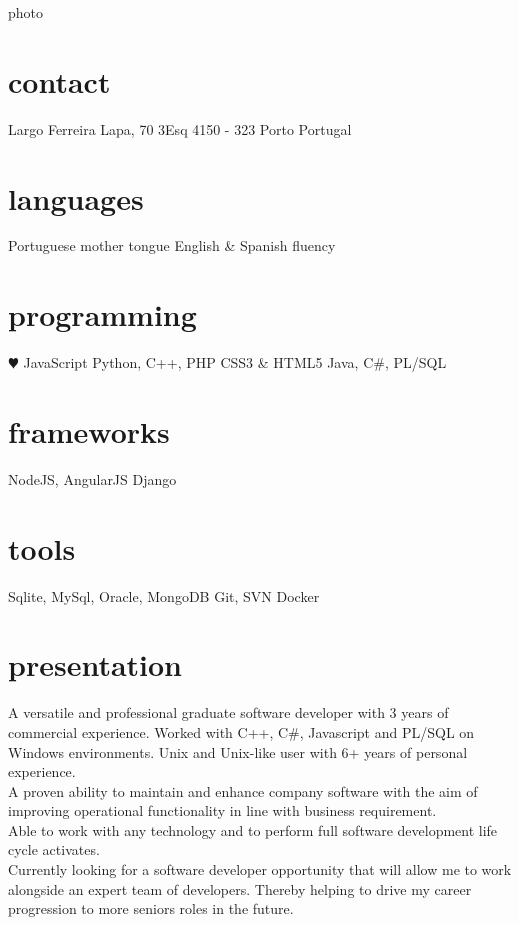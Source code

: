 \documentclass[]{friggeri-cv} %
\begin{document}


\begin{aside}{photo} %
\section{contact}
Largo Ferreira Lapa, 70 3Esq
4150 - 323 Porto
Portugal
~
~
\section{languages}
Portuguese mother tongue
English \& Spanish fluency
\section{programming}
{\color{red} $\varheartsuit$} JavaScript
Python, C++, PHP
CSS3 \& HTML5
Java, C\#, PL/SQL
\section{frameworks}
NodeJS, AngularJS
Django
\section{tools}
Sqlite, MySql,
Oracle, MongoDB
Git, SVN
Docker
\end{aside}


\section{presentation}
A versatile and professional graduate software developer with 3 years of commercial experience. Worked with C++, C\#, Javascript and PL/SQL on Windows environments. Unix and Unix-like user with 6+ years of personal experience. \\
A proven ability to maintain and enhance company software with the aim of improving operational functionality in line with business requirement. \\
Able to work with any technology and to perform full software development life cycle activates.\\
Currently looking for a software developer opportunity that will allow me to work alongside an expert team of developers. Thereby helping to drive my career progression to more seniors roles in the future.
\end{document}
